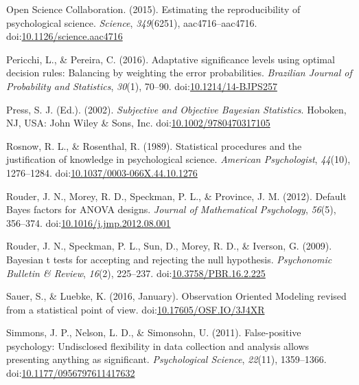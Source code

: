 \documentclass[english,man]{apa6}
\theoremstyle{definition}
\theoremstyle{definition}
\theoremstyle{definition}
\theoremstyle{remark}
\begin{document}
\hypertarget{ref-OpenScienceCollaboration2015}{}
Open Science Collaboration. (2015). Estimating the reproducibility of
psychological science. \emph{Science}, \emph{349}(6251),
aac4716--aac4716.
doi:\href{https://doi.org/10.1126/science.aac4716}{10.1126/science.aac4716}

\hypertarget{ref-Pericchi2016}{}
Pericchi, L., \& Pereira, C. (2016). Adaptative significance levels
using optimal decision rules: Balancing by weighting the error
probabilities. \emph{Brazilian Journal of Probability and Statistics},
\emph{30}(1), 70--90.
doi:\href{https://doi.org/10.1214/14-BJPS257}{10.1214/14-BJPS257}

\hypertarget{ref-Press2002}{}
Press, S. J. (Ed.). (2002). \emph{Subjective and Objective Bayesian
Statistics}. Hoboken, NJ, USA: John Wiley \& Sons, Inc.
doi:\href{https://doi.org/10.1002/9780470317105}{10.1002/9780470317105}

\hypertarget{ref-Rosnow1989}{}
Rosnow, R. L., \& Rosenthal, R. (1989). Statistical procedures and the
justification of knowledge in psychological science. \emph{American
Psychologist}, \emph{44}(10), 1276--1284.
doi:\href{https://doi.org/10.1037/0003-066X.44.10.1276}{10.1037/0003-066X.44.10.1276}

\hypertarget{ref-Rouder2012}{}
Rouder, J. N., Morey, R. D., Speckman, P. L., \& Province, J. M. (2012).
Default Bayes factors for ANOVA designs. \emph{Journal of Mathematical
Psychology}, \emph{56}(5), 356--374.
doi:\href{https://doi.org/10.1016/j.jmp.2012.08.001}{10.1016/j.jmp.2012.08.001}

\hypertarget{ref-Rouder2009}{}
Rouder, J. N., Speckman, P. L., Sun, D., Morey, R. D., \& Iverson, G.
(2009). Bayesian t tests for accepting and rejecting the null
hypothesis. \emph{Psychonomic Bulletin \& Review}, \emph{16}(2),
225--237.
doi:\href{https://doi.org/10.3758/PBR.16.2.225}{10.3758/PBR.16.2.225}

\hypertarget{ref-Sauer2016}{}
Sauer, S., \& Luebke, K. (2016, January). Observation Oriented Modeling
revised from a statistical point of view.
doi:\href{https://doi.org/10.17605/OSF.IO/3J4XR}{10.17605/OSF.IO/3J4XR}

\hypertarget{ref-Simmons2011}{}
Simmons, J. P., Nelson, L. D., \& Simonsohn, U. (2011). False-positive
psychology: Undisclosed flexibility in data collection and analysis
allows presenting anything as significant. \emph{Psychological Science},
\emph{22}(11), 1359--1366.
doi:\href{https://doi.org/10.1177/0956797611417632}{10.1177/0956797611417632}
\end{document}
